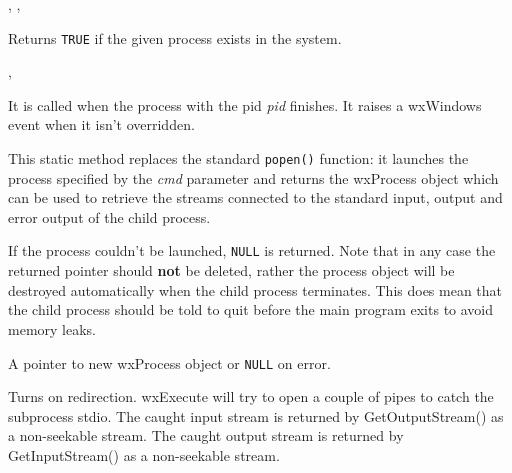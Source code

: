 
,\rtfsp
{},\rtfsp
{}

\label{wxprocessexists}


Returns {\tt TRUE} if the given process exists in the system.


,\rtfsp
{}

\label{wxprocessonterminate}


It is called when the process with the pid {\it pid} finishes.
It raises a wxWindows event when it isn't overridden.



\label{wxprocessopen}


This static method replaces the standard {\tt popen()} function: it launches
the process specified by the {\it cmd} parameter and returns the wxProcess
object which can be used to retrieve the streams connected to the standard
input, output and error output of the child process.

If the process couldn't be launched, {\tt NULL} is returned. Note that in any
case the returned pointer should {\bf not} be deleted, rather the process
object will be destroyed automatically when the child process terminates. This
does mean that the child process should be told to quit before the main program
exits to avoid memory leaks.




A pointer to new wxProcess object or {\tt NULL} on error.



\label{wxprocessredirect}


Turns on redirection. wxExecute will try to open a couple of pipes
to catch the subprocess stdio. The caught input stream is returned by
GetOutputStream() as a non-seekable stream. The caught output stream is returned
by GetInputStream() as a non-seekable stream.

